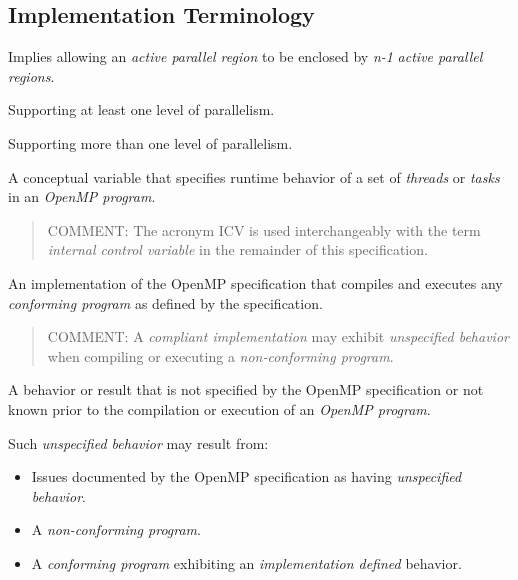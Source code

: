 \subsection{Implementation Terminology}
\label{subsec:Implementation Terminology}
\glossarydefstart
Implies allowing an \emph{active parallel region} to be enclosed by \emph{n-1} \emph{active parallel
regions}.
\glossarydefend

\glossarydefstart
Supporting at least one level of parallelism.
\glossarydefend
\bigskip

\glossarydefstart
Supporting more than one level of parallelism.
\glossarydefend
\bigskip

\glossarydefstart
A conceptual variable that specifies runtime behavior of a set of \emph{threads} or \emph{tasks}
in an \emph{OpenMP program}.

\begin{quote}
COMMENT: The acronym ICV is used interchangeably with the term \emph{internal
control variable} in the remainder of this specification.
\end{quote}
\glossarydefend

\glossarydefstart
An implementation of the OpenMP specification that compiles and executes any
\emph{conforming program} as defined by the specification.

\begin{quote}
COMMENT: A \emph{compliant implementation} may exhibit \emph{unspecified behavior} when
compiling or executing a \emph{non-conforming program}.
\end{quote}
\glossarydefend

\glossarydefstart
A behavior or result that is not specified by the OpenMP specification or not
known prior to the compilation or execution of an \emph{OpenMP program}.

Such \emph{unspecified behavior} may result from:

\begin{itemize}
\item Issues documented by the OpenMP specification as having \emph{unspecified
behavior}.

\item A \emph{non-conforming program}.

\item A \emph{conforming program} exhibiting an \emph{implementation defined} behavior.
\end{itemize}
\glossarydefend

